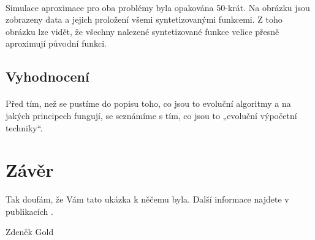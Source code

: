\documentclass[bc,male,java,dept460]{diploma}		%
\begin{document}
\paragraph*{}
Simulace aproximace pro oba problémy byla opakována 50-krát. Na obrázku jsou zobrazeny data a jejich proložení všemi syntetizovanými funkcemi. Z toho obrázku lze vidět, že všechny nalezené syntetizované funkce velice přesně aproximují původní funkci.

\subsection{Vyhodnocení}
\paragraph*{}
Před tím, než se pustíme do popisu toho, co jsou to evoluční algoritmy a na jakých principech fungují, se seznámíme s tím, co jsou to „evoluční výpočetní techniky“.

\section{Závěr}
\label{sec:Conclusion}
Tak doufám, že Vám tato ukázka k něčemu byla. Další informace najdete v publikacích
\cite{goossens94,lamport94}.

\bigskip
\begin{flushright}
Zdeněk Gold
\end{flushright}
\end{document}
